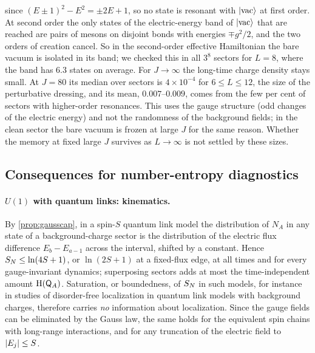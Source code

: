 \begin{remark}
\begin{enumerate}[label=(\alph*)]
since $(E\pm1)^2-E^2=\pm2E+1$, so no state is resonant with $|\rm vac\rangle$ at first order.  At second order the only
states of the electric-energy band of $|\rm vac\rangle$ that are reached are pairs of mesons on disjoint bonds with energies
$\mp g^2/2$, and the two orders of creation cancel.  So in the second-order effective Hamiltonian the bare vacuum is
isolated in its band; we checked this in all $3^8$ sectors for $L=8$, where the band has $6.3$ states on average.  For
$J\to\infty$ the long-time charge density stays small.  At $J=80$ its median over sectors is $4\times10^{-4}$ for
$6\le L\le12$, the size of the perturbative dressing, and its mean, $0.007$--$0.009$, comes from the few per cent of
sectors with higher-order resonances.  This uses the gauge structure (odd changes of the electric energy) and not the
randomness of the background fields; in the clean sector the bare vacuum is frozen at large $J$ for the same reason.
Whether the memory at fixed large $J$ survives as $L\to\infty$ is not settled by these sizes.
\end{enumerate}
\end{remark}

\subsection{Consequences for number-entropy diagnostics}\label{sec:u1:diag}

\paragraph{$U(1)$ with quantum links: kinematics.}
By \cref{prop:gausscap}, in a spin-$S$ quantum link model the distribution of $N_A$ in any state of a
background-charge sector is the distribution of the electric flux difference $E_b-E_{a-1}$ across the
interval, shifted by a constant.  Hence $S_{N}\le\ln(4S+1)$, or $\ln(2S+1)$ at a fixed-flux edge, at all times and
for every gauge-invariant dynamics; superposing sectors adds at most the time-independent amount $\mathrm{H}(\mathsf{Q}_A)$.  Saturation,
or boundedness, of $S_{N}$ in such models, for instance in studies of disorder-free localization in quantum link
models with background charges, therefore carries \emph{no} information about localization.  Since the gauge
fields can be eliminated by the Gauss law, the same holds for the equivalent spin chains with long-range
interactions, and for any truncation of the electric field to $\left|E_j\right|\le S$.

